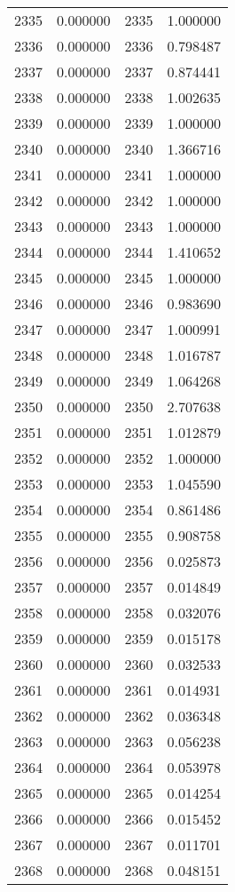 \documentclass[12pt]{article}
\begin{document}
\begin{longtable}{@{}cccc@{}}
2335 & 0.000000 & 2335 & 1.000000 \\
2336 & 0.000000 & 2336 & 0.798487 \\
2337 & 0.000000 & 2337 & 0.874441 \\
2338 & 0.000000 & 2338 & 1.002635 \\
2339 & 0.000000 & 2339 & 1.000000 \\
2340 & 0.000000 & 2340 & 1.366716 \\
2341 & 0.000000 & 2341 & 1.000000 \\
2342 & 0.000000 & 2342 & 1.000000 \\
2343 & 0.000000 & 2343 & 1.000000 \\
2344 & 0.000000 & 2344 & 1.410652 \\
2345 & 0.000000 & 2345 & 1.000000 \\
2346 & 0.000000 & 2346 & 0.983690 \\
2347 & 0.000000 & 2347 & 1.000991 \\
2348 & 0.000000 & 2348 & 1.016787 \\
2349 & 0.000000 & 2349 & 1.064268 \\
2350 & 0.000000 & 2350 & 2.707638 \\
2351 & 0.000000 & 2351 & 1.012879 \\
2352 & 0.000000 & 2352 & 1.000000 \\
2353 & 0.000000 & 2353 & 1.045590 \\
2354 & 0.000000 & 2354 & 0.861486 \\
2355 & 0.000000 & 2355 & 0.908758 \\
2356 & 0.000000 & 2356 & 0.025873 \\
2357 & 0.000000 & 2357 & 0.014849 \\
2358 & 0.000000 & 2358 & 0.032076 \\
2359 & 0.000000 & 2359 & 0.015178 \\
2360 & 0.000000 & 2360 & 0.032533 \\
2361 & 0.000000 & 2361 & 0.014931 \\
2362 & 0.000000 & 2362 & 0.036348 \\
2363 & 0.000000 & 2363 & 0.056238 \\
2364 & 0.000000 & 2364 & 0.053978 \\
2365 & 0.000000 & 2365 & 0.014254 \\
2366 & 0.000000 & 2366 & 0.015452 \\
2367 & 0.000000 & 2367 & 0.011701 \\
2368 & 0.000000 & 2368 & 0.048151 \\

\end{longtable}
\end{document}
